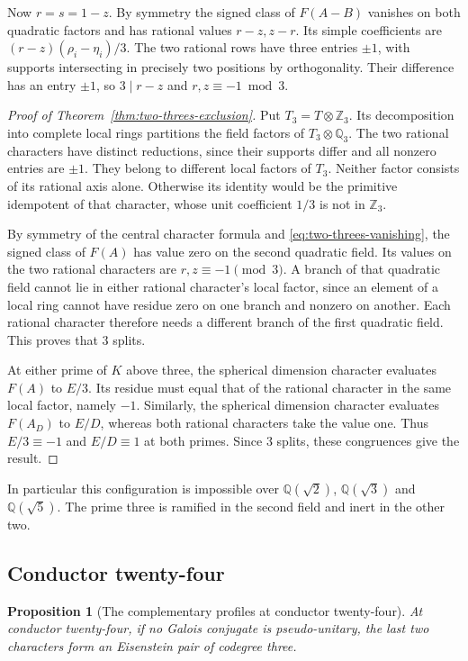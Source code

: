 \documentclass[11pt,reqno]{amsart}
\newtheorem{proposition}[theorem]{Proposition}
\theoremstyle{remark}\newtheorem{remark}[theorem]{Remark}
\numberwithin{equation}{section}
\begin{document}
Now $r=s=1-z$. By symmetry the signed class of $F(A-B)$ vanishes
on both quadratic factors and has rational values $r-z,z-r$.
Its simple coefficients are $(r-z)(\rho_i-\eta_i)/3$.
The two rational rows have three entries $\pm1$, with supports
intersecting in precisely two positions by orthogonality. Their
difference has an entry $\pm1$, so $3\mid r-z$ and $r,z\equiv-1\bmod3$.

\begin{proof}[Proof of Theorem~\ref{thm:two-threes-exclusion}]
Put $T_3=T\otimes\mathbb Z_3$. Its decomposition into complete local rings partitions the field factors of $T_3\otimes\mathbb Q_3$. The two rational characters have distinct reductions, since their supports differ and all nonzero entries are $\pm1$. They belong to different local factors of $T_3$. Neither factor consists of its rational axis alone. Otherwise its identity would be the primitive idempotent of that character, whose unit coefficient $1/3$ is not in $\mathbb Z_3$.

By symmetry of the central character formula and \eqref{eq:two-threes-vanishing}, the signed class of $F(A)$ has value zero on the second quadratic field. Its values on the two rational characters are $r,z\equiv-1\pmod3$. A branch of that quadratic field cannot lie in either rational character's local factor, since an element of a local ring cannot have residue zero on one branch and nonzero on another. Each rational character therefore needs a different branch of the first quadratic field. This proves that $3$ splits.

At either prime of $K$ above three, the spherical dimension character evaluates $F(A)$ to $E/3$. Its residue must equal that of the rational character in the same local factor, namely $-1$. Similarly, the spherical dimension character evaluates $F(A_D)$ to $E/D$, whereas both rational characters take the value one. Thus $E/3\equiv-1$ and $E/D\equiv1$ at both primes. Since $3$ splits, these congruences give the result.
\end{proof}

In particular this configuration is impossible over $\mathbb Q(\sqrt2)$, $\mathbb Q(\sqrt3)$ and $\mathbb Q(\sqrt5)$. The prime three is ramified in the second field and inert in the other two.

\subsection{Conductor twenty-four}

\begin{proposition}[The complementary profiles at conductor twenty-four]
\label{prop:r6-twenty-four-complements}
At conductor twenty-four, if no Galois conjugate is pseudo-unitary,
the last two characters form an Eisenstein pair of codegree three.
\end{proposition}
\end{document}
